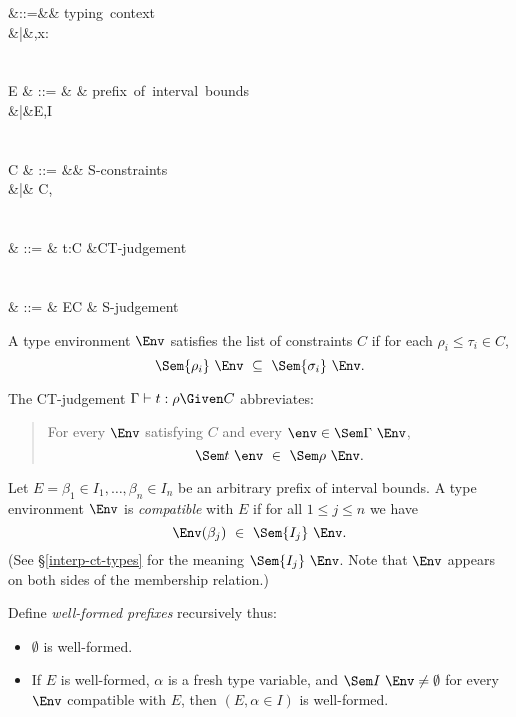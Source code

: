 \documentclass{amsart}
\begin{document}
\begin{syntax}
\Gamma &::=&\emptyset& \mbox{typing context}\\
&|&\Gamma,x:\sigma\\
\\\\
E & ::= & \emptyset & \mbox{prefix of interval bounds}\\
&|&E,\alpha\in I\\
\\\\
C & ::= &\emptyset& \mbox{S-constraints}\\
&|& C,\rho\le\tau\\
\\\\
\JCT & ::= & \Gamma\vdash t:\rho\Given C
&\mbox{CT-judgement}\\
\\\\
\JS & ::= & E\vdash C & \mbox{S-judgement}
\end{syntax}

A type environment $\Env$ satisfies the list of constraints $C$
if for each $\rho_i\le\tau_i\in C$,
\[
\Sem{\rho_i}~\Env\ \subseteq\ \Sem{\sigma_i}~\Env.
\]

The CT-judgement $\Gamma\vdash t:\rho\Given C$ abbreviates:
\begin{quotation}
For every $\Env$ satisfying $C$ and every
$\env\in\Sem\Gamma~\Env$,
\[
\Sem t~\env\ \in\ \Sem\rho~\Env.
\]
\end{quotation}

Let $E=\beta_1\in I_1,\ldots,\beta_n\in I_n$ be an arbitrary
prefix of interval bounds. A type environment $\Env$ is
\emph{compatible} with $E$ if for all $1\le j\le n$ we have
\[
\Env(\beta_j)\ \in\ \Sem{I_j}~\Env.
\]
(See \S\ref{interp-ct-types} for the meaning $\Sem{I_j}~\Env$.
Note that $\Env$ appears on both sides of the membership relation.)

\begin{samepage}
Define \emph{well-formed prefixes} recursively thus:
\begin{itemize}
\item $\emptyset$ is well-formed.
\item If $E$ is well-formed, $\alpha$ is a fresh type variable,
and $\Sem I~\Env\neq\emptyset$ for every $\Env$ compatible with
$E$, then $(E,\alpha\in I)$ is well-formed.
\end{itemize}
\end{samepage}
\end{document}
